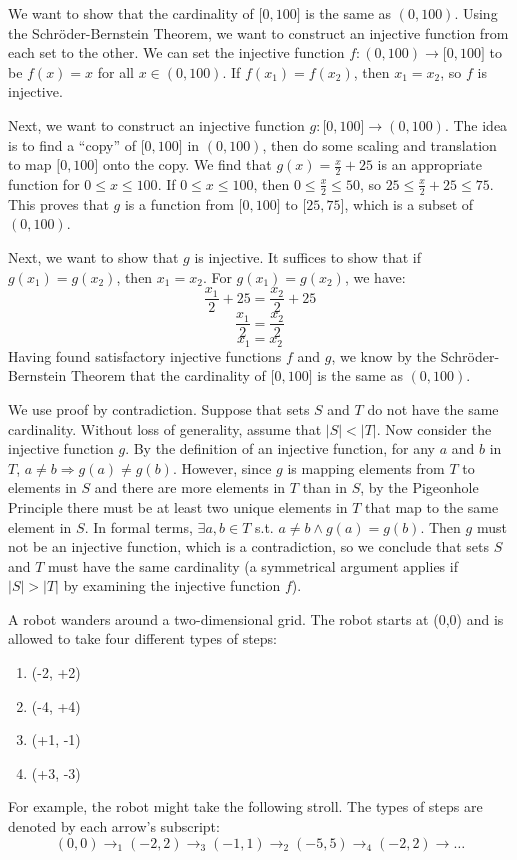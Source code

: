 \documentclass[solution, letterpaper]{cs20}
\begin{document}
\begin{solution}
\subsolution We want to show that the cardinality of $\big[0,100\big]$ is the same as $(0,100)$. Using the Schr\"{o}der-Bernstein Theorem, we want to construct an injective function from each set to the other. We can set the injective function $f : (0, 100) \rightarrow \big[0, 100\big]$ to be $f(x) = x$ for all $x \in (0, 100)$. If $f(x_1) = f(x_2)$, then $x_1 = x_2$, so $f$ is injective.

Next, we want to construct an injective function $g : \big[0, 100\big] \rightarrow (0, 100)$. The idea is to find a ``copy'' of $\big[0, 100\big]$ in $(0, 100)$, then do some scaling and translation to map $\big[0, 100\big]$ onto the copy. We find that $g(x) = \frac{x}{2} + 25$ is an appropriate function for $0 \leq x \leq 100$. If $0 \leq x \leq 100$, then $0 \leq \frac{x}{2} \leq 50$, so $25 \leq \frac{x}{2} + 25 \leq 75$. This proves that $g$ is a function from $\big[0, 100\big]$ to $\big[25, 75\big]$, which is a subset of $(0,100)$.

Next, we want to show that $g$ is injective. It suffices to show that if $g(x_1) = g(x_2)$, then $x_1 = x_2$. For $g(x_1) = g(x_2)$, we have: 
$$\frac{x_1}{2} + 25 = \frac{x_2}{2} + 25$$
$$\frac{x_1}{2} = \frac{x_2}{2}$$
$$x_1 = x_2$$
Having found satisfactory injective functions $f$ and $g$, we know by the Schr\"{o}der-Bernstein Theorem that the cardinality of $\big[0,100\big]$ is the same as $(0,100)$.

\subsolution We use proof by contradiction. Suppose that sets $S$ and $T$ do not have the same cardinality. Without loss of generality, assume that $|S| < |T|$. Now consider the injective function $g$. By the definition of an injective function, for any $a$ and $b$ in $T$, $a \neq b \Rightarrow g(a) \neq g(b)$. However, since $g$ is mapping elements from $T$ to elements in $S$ and there are more elements in $T$ than in $S$, by the Pigeonhole Principle there must be at least two unique elements in $T$ that map to the same element in $S$. In formal terms, $\exists a,b \in T $ s.t. $a \neq b \wedge g(a) = g(b)$. Then $g$ must not be an injective function, which is a contradiction, so we conclude that sets $S$ and $T$ must have the same cardinality (a symmetrical argument applies if $|S| > |T|$ by examining the injective function $f$).
\end{solution}

A robot wanders around a two-dimensional grid. The robot starts at (0,0) and is allowed to take four different types of steps:
\begin{enumerate}
\item (-2, +2)
\item (-4, +4)
\item (+1, -1)
\item (+3, -3)
\end{enumerate}
For example, the robot might take the following stroll. The types of steps are denoted by each arrow's subscript:
$$(0,0) \to_1 (-2,2) \to_3 (-1,1) \to_2 (-5,5) \to_4 (-2,2) \to \ldots$$
\end{document}
